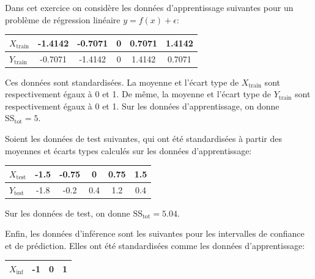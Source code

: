\documentclass[solutions]{../exercices}
\begin{document}
	
		
	\begin{exercice}
		Dans cet exercice on considère les données d'apprentissage suivantes pour un problème de régression linéaire $y = f(x) + \epsilon$:
		
		\begin{table}[!h]
			\centering
			\begin{tabular}{@{}|lccccc|@{}}
				\hline
				$X_{\text{train}}$ & -1.4142 & -0.7071 & 0 & 0.7071 & 1.4142 \\
				\hline
				$Y_{\text{train}}$ & -0.7071 & -1.4142 & 0 & 1.4142 & 0.7071 \\
				\hline
			\end{tabular}%
		\end{table}
		
		Ces données sont standardisées. La moyenne et l'écart type de $X_{\text{train}}$ sont respectivement égaux à 0 et 1. De même, la moyenne et l'écart type de $Y_{\text{train}}$ sont respectivement égaux à 0 et 1. Sur les données d'apprentissage, on donne $\text{SS}_{\text{tot}} = 5$.
		
		Soient les données de test suivantes, qui ont été standardisées à partir des moyennes et écarts types calculés sur les données d'apprentissage:
		
		\begin{table}[!h]
			\centering
			\begin{tabular}{@{}|lccccc|@{}}
				\hline
				$X_{\text{test}}$ & -1.5 & -0.75 & 0 & 0.75 & 1.5 \\
				\hline
				$Y_{\text{test}}$ & -1.8 & -0.2 & 0.4 & 1.2 & 0.4 \\
				\hline
			\end{tabular}%
		\end{table}
		
		Sur les données de test, on donne $\text{SS}_{\text{tot}} = 5.04$.
		
		Enfin, les données d'inférence sont les suivantes pour les intervalles de confiance et de prédiction. Elles ont été standardisées comme les données d'apprentissage:
		
		\begin{table}[!h]
			\centering
			\begin{tabular}{@{}|lccc|@{}}
				\hline
				$X_{\text{inf}}$ & -1 & 0 & 1 \\
				\hline
			\end{tabular}%
		\end{table}
		

\end{exercice}
\end{document}
